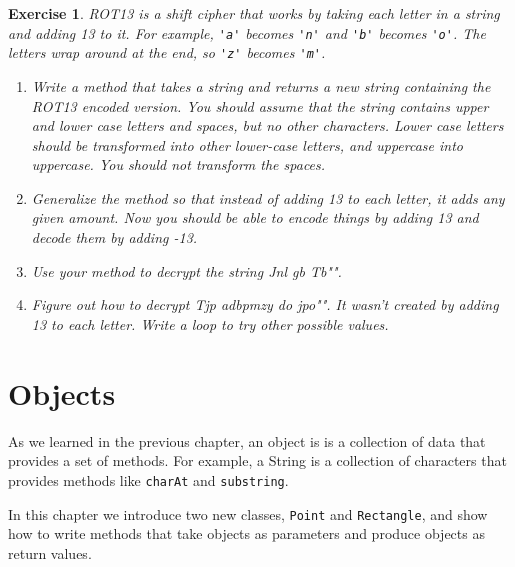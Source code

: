 \documentclass[12pt]{book}
\theoremstyle{exercise}
\newtheorem{exercise}{Exercise}[chapter]
\newcommand{\java}[1]{\verb"#1"}
\newcommand{\java}[1]{\lstinline{#1}} %
\begin{document}
\begin{exercise}

ROT13 is a {\em shift cipher} that works by taking each letter in a string and adding 13 to it.
For example, \java{'a'} becomes \java{'n'} and \java{'b'} becomes \java{'o'}.
The letters wrap around at the end, so \java{'z'} becomes \java{'m'}.

\begin{enumerate}

\item Write a method that takes a string and returns a new string containing the ROT13 encoded version.
You should assume that the string contains upper and lower case letters and spaces, but no other characters.
Lower case letters should be transformed into other lower-case letters, and uppercase into uppercase.
You should not transform the spaces.

\item Generalize the method so that instead of adding 13 to each letter, it adds any given amount.
Now you should be able to encode things by adding 13 and decode them by adding -13.

\item Use your method to decrypt the string \java{"Jnl gb Tb"}.

\item Figure out how to decrypt \java{"Tjp adbpmzy do jpo"}.
It wasn't created by adding 13 to each letter.
Write a loop to try other possible values.

\end{enumerate}

\end{exercise}


\chapter{Objects}
\label{objects}


As we learned in the previous chapter, an object is is a collection of data that provides a set of methods.
For example, a String is a collection of characters that provides methods like \java{charAt} and \java{substring}.

In this chapter we introduce two new classes, \java{Point} and \java{Rectangle}, and show how to write methods that take objects as parameters and produce objects as return values.


\end{document}
